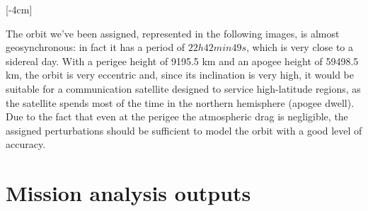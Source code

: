 \documentclass[11pt,a4paper]{report}
\begin{document}
\begin{table}[H]
\centering
{}
\caption{Mission requirements}
\label{tab:Mission_requirements}
\end{table}

[-4cm]

The orbit we've been assigned, represented in the following images, is almost geosynchronous: in fact it has a period of $22h 42 min 49s$, which is very close to a sidereal day. With a perigee height of 9195.5 km and an apogee height of 59498.5 km, the orbit is very eccentric and, since its inclination is very high, it would be suitable for a communication satellite designed to service high-latitude regions, as the satellite spends most of the time in the northern hemisphere (apogee dwell).  
Due to the fact that even at the perigee the atmospheric drag is negligible, the assigned perturbations should be sufficient to model the orbit with a good level of accuracy.
\chapter{Mission analysis outputs}
\end{document}
